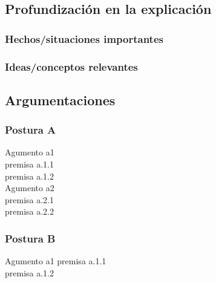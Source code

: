 \documentclass[12pt, twoside]{article}
\begin{document}
\subsection{Profundización en la explicación}%

\subsubsection{Hechos/situaciones importantes}%

\subsubsection{Ideas/conceptos relevantes}%


\subsection{Argumentaciones}%

\subsubsection{Postura A}%

Agumento a1\\
premisa a.1.1\\
premisa a.1.2\\
Agumento a2\\
premisa a.2.1\\
premisa a.2.2

\subsubsection{Postura B}%

Agumento a1
premisa a.1.1\\
premisa a.1.2
\end{document}

